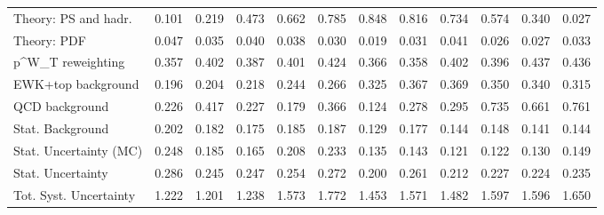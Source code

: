 \begin{tabular}{l|p{0.6cm}p{0.6cm}p{0.6cm}p{0.6cm}p{0.6cm}p{0.6cm}p{0.6cm}p{0.6cm}p{0.6cm}p{0.6cm}p{0.6cm}}
Theory: PS and hadr.                     & 0.101 & 0.219 & 0.473 & 0.662 & 0.785 & 0.848 & 0.816 & 0.734 & 0.574 & 0.340 & 0.027 \\
Theory: PDF                              & 0.047 & 0.035 & 0.040 & 0.038 & 0.030 & 0.019 & 0.031 & 0.041 & 0.026 & 0.027 & 0.033 \\
p^{W}_{T} reweighting                    & 0.357 & 0.402 & 0.387 & 0.401 & 0.424 & 0.366 & 0.358 & 0.402 & 0.396 & 0.437 & 0.436 \\
EWK+top background                       & 0.196 & 0.204 & 0.218 & 0.244 & 0.266 & 0.325 & 0.367 & 0.369 & 0.350 & 0.340 & 0.315 \\
QCD background                           & 0.226 & 0.417 & 0.227 & 0.179 & 0.366 & 0.124 & 0.278 & 0.295 & 0.735 & 0.661 & 0.761 \\
Stat. Background                         & 0.202 & 0.182 & 0.175 & 0.185 & 0.187 & 0.129 & 0.177 & 0.144 & 0.148 & 0.141 & 0.144 \\
Stat. Uncertainty (MC)                   & 0.248 & 0.185 & 0.165 & 0.208 & 0.233 & 0.135 & 0.143 & 0.121 & 0.122 & 0.130 & 0.149 \\
\hline
Stat. Uncertainty                        & 0.286 & 0.245 & 0.247 & 0.254 & 0.272 & 0.200 & 0.261 & 0.212 & 0.227 & 0.224 & 0.235 \\
\hline
Tot. Syst. Uncertainty                   & 1.222 & 1.201 & 1.238 & 1.573 & 1.772 & 1.453 & 1.571 & 1.482 & 1.597 & 1.596 & 1.650 \\
\hline
\end{tabular}
